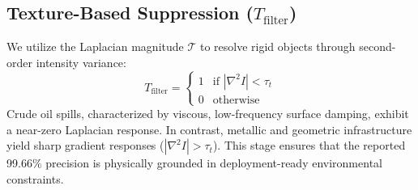 \subsection{Texture-Based Suppression ($T_{\text{filter}}$)}
We utilize the Laplacian magnitude $\mathcal{T}$ to resolve rigid objects through second-order intensity variance:
\begin{equation}
T_{\text{filter}} = \begin{cases} 1 & \text{if } |\nabla^2 I| < \tau_t \\ 0 & \text{otherwise} \end{cases}
\end{equation}
Crude oil spills, characterized by viscous, low-frequency surface damping, exhibit a near-zero Laplacian response. In contrast, metallic and geometric infrastructure yield sharp gradient responses ($|\nabla^2 I| > \tau_t$). This stage ensures that the reported 99.66\% precision is physically grounded in deployment-ready environmental constraints.
